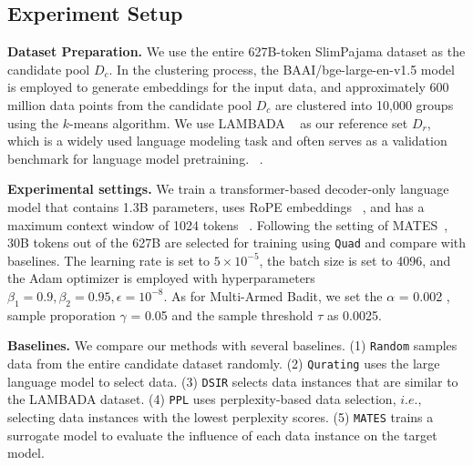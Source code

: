 \documentclass{article} %
\begin{document}
\subsection{Experiment Setup}

\textbf{Dataset Preparation.}
We use the entire 627B-token SlimPajama dataset as the candidate pool $D_c$. In the clustering process, the BAAI/bge-large-en-v1.5 model is employed to generate embeddings for the input data, and approximately 600 million data points from the candidate pool $D_c$ are clustered into 10,000 groups using the $k$-means algorithm. We use LAMBADA ~\citep{paperno2016lambada} as our reference set $D_r$, which is a widely used language modeling task and often serves as a validation benchmark for language model pretraining. ~\citep{yu2024mates, xie2023data, hoffmann2022empirical}.



\textbf{Experimental settings.}
We train a transformer-based decoder-only language model that contains 1.3B parameters, uses RoPE embeddings ~\citep{su2023enhanced}, and has a maximum context window of 1024 tokens ~\citep{touvron2023llama}. 
%
Following the setting of MATES~\citep{su2023enhanced}, 30B tokens out of the 627B are selected for training using \texttt{Quad} and compare with baselines.
%
%
The learning rate is set to $5 \times 10^{-5}$, the batch size is set to 4096, and the Adam optimizer is employed with hyperparameters $\beta_1 = 0.9, \beta_2 = 0.95, \epsilon = 10^{-8}$. As for Multi-Armed Badit, we set the $\alpha$ = 0.002 , sample proporation $\gamma$ = 0.05 and the sample threshold $\tau$ as 0.0025.

\textbf{Baselines.} We compare our methods with several baselines. (1) \texttt{Random} samples  data from the entire candidate dataset randomly. (2) \texttt{Qurating} uses the large language model to select data. (3) \texttt{DSIR} selects data instances that are similar to the LAMBADA dataset. (4) \texttt{PPL} uses perplexity-based data selection, $i.e.,$ selecting data instances with the lowest perplexity scores. (5) \texttt{MATES} trains a surrogate model to evaluate the influence of each data instance on the target model.
\end{document}
